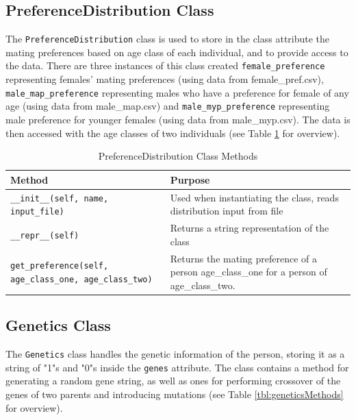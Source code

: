 \documentclass[authoryearcitations]{UoYCSproject}
\begin{document}
\newpage
\subsection{PreferenceDistribution Class}
The \texttt{PreferenceDistribution} class is used to store in the class attribute \texttt{} the mating preferences based on age class of each individual, and to provide access to the data. There are three instances of this class created \texttt{female\_preference} representing females' mating preferences (using data from female\_pref.csv), \texttt{male\_map\_preference} representing males who have a preference for female of any age (using data from male\_map.csv) and \texttt{male\_myp\_preference} representing male preference for younger females (using data from male\_myp.csv). The data is then accessed with the age classes of two individuals (see Table \ref{tbl:preferenceDistributionMethods} for overview).

\begin{table}[h]
\caption{PreferenceDistribution Class Methods}
\label{tbl:preferenceDistributionMethods}
\begin{tabular}{m{} m{}}
\textbf{Method} & \textbf{Purpose} \\\hline
\texttt{\_\_init\_\_(self, name, input\_file)} & Used when instantiating the class, reads distribution input from file\\\hline
\texttt{\_\_repr\_\_(self)} & Returns a string representation of the class \\\hline
\texttt{get\_preference(self, age\_class\_one, age\_class\_two)} & Returns the mating preference of a person age\_class\_one for a person of age\_class\_two.
\end{tabular}
\end{table}

\newpage
\subsection{Genetics Class}
The \texttt{Genetics} class handles the genetic information of the person, storing it as a string of "1"s and "0"s inside the \texttt{genes} attribute. The class contains a method for generating a random gene string, as well as ones for performing crossover of the genes of two parents and introducing mutations (see Table \ref{tbl:geneticsMethods} for overview).
\end{document}
